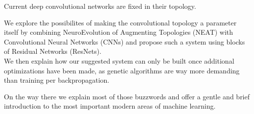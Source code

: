 Current deep convolutional networks are fixed in their topology.

We explore the possibilites of making the convolutional topology a parameter itself by combining NeuroEvolution of Augmenting Topologies (NEAT) with Convolutional Neural Networks (CNNs) and propose such a system using blocks of Residual Networks (ResNets).\\
We then explain how our suggested system can only be built once additional optimizations have been made, as genetic algorithms are way more demanding than training per backpropagation.

On the way there we explain most of those buzzwords and offer a gentle and brief introduction to the most important modern areas of machine learning.